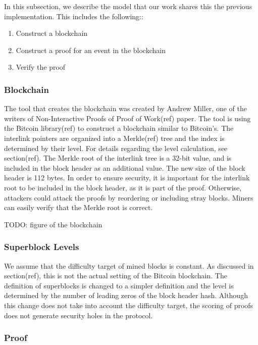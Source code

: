 In this subsection, we describe the model that our work shares this the
previous implementation. This includes the following::

\begin{enumerate}
    \item
        Construct a blockchain
    \item
        Construct a proof for an event in the blockchain
    \item
        Verify the proof
\end{enumerate}


\subsubsection{Blockchain}

The tool that creates the blockchain was created by Andrew Miller, one of the
writers of Non-Interactive Proofs of Proof of Work(ref) paper.  The tool is
using the Bitcoin library(ref) to construct a blockchain similar to Bitcoin’s.
The interlink pointers are organized into a Merkle(ref) tree and the index is
determined by their level. For details regarding the level calculation, see
section(ref). The Merkle root of the interlink tree is a 32-bit value, and is
included in the block header as an additional value. The new size of the block
header is 112 bytes. In order to ensure security, it is important for the
interlink root to be included in the block header, as it is part of the proof.
Otherwise, attackers could attack the proofs by reordering or including stray
blocks. Miners can easily verify that the Merkle root is correct.

TODO: figure of the blockchain

\subsubsection{Superblock Levels}

We assume that the difficulty target of mined blocks is constant. As discussed
in section(ref), this is not the actual setting of the Bitcoin blockchain. The
definition of superblocks is changed to a simpler definition and the level is
determined by the number of leading zeros of the block header hash. Although
this change does not take into account the difficulty target, the scoring of
proofs does not generate security holes in the protocol.

\subsubsection{Proof}

